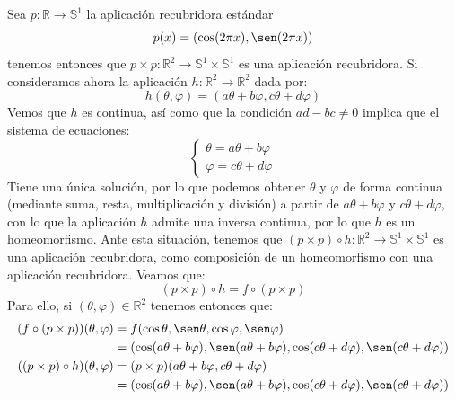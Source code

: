 \documentclass[12pt]{article}
\begin{document}
\begin{ejercicio}
        \noindent
        Sea $p:\mathbb{R}\to \mathbb{S}^1$ la aplicación recubridora estándar
        \begin{equation*}
            p(x) = (\cos(2\pi x),\sen(2\pi x))
        \end{equation*}
        tenemos entonces que $p\times p:\mathbb{R}^2\to \mathbb{S}^1\times \mathbb{S}^1$ es una aplicación recubridora. Si consideramos ahora la aplicación $h:\mathbb{R}^2\to \mathbb{R}^2$ dada por:
        \begin{equation*}
            h(\theta,\varphi) = (a\theta + b\varphi, c\theta + d\varphi)
        \end{equation*}
        Vemos que $h$ es continua, así como que la condición $ad-bc\neq 0$ implica que el sistema de ecuaciones:
        \begin{equation*}
            \left\{\begin{array}{l}
                \theta = a\theta + b\varphi \\
                \varphi = c\theta + d\varphi
            \end{array}\right.
        \end{equation*}
        Tiene una única solución, por lo que podemos obtener $\theta$ y $\varphi$ de forma continua (mediante suma, resta, multiplicación y división) a partir de $a\theta+b\varphi$ y $c\theta + d\varphi$, con lo que la aplicación $h$ admite una inversa continua, por lo que $h$ es un homeomorfismo. Ante esta situación, tenemos que $(p\times p)\circ h:\mathbb{R}^2\to \mathbb{S}^1\times \mathbb{S}^1$ es una aplicación recubridora, como composición de un homeomorfismo con una aplicación recubridora. Veamos que:
        \begin{equation*}
            (p\times p) \circ h = f \circ (p\times p)
        \end{equation*}
        Para ello, si $(\theta,\varphi)\in \mathbb{R}^2$ tenemos entonces que:
        \begin{align*}
            (f\circ (p\times p))(\theta,\varphi) &= f(\cos\theta,\sen\theta,\cos\varphi,\sen\varphi) \\
                                                 &= (\cos(a\theta + b\varphi), \sen(a\theta + b\varphi), \cos(c\theta + d\varphi), \sen(c\theta + d\varphi)) \\
            ((p\times p)\circ h)(\theta,\varphi) &= (p\times p)(a\theta+b\varphi, c\theta +d\varphi) \\
                                                 &= (\cos(a\theta + b\varphi), \sen(a\theta + b\varphi), \cos(c\theta + d\varphi), \sen(c\theta + d\varphi))

\end{align*}
\end{ejercicio}
\end{document}
